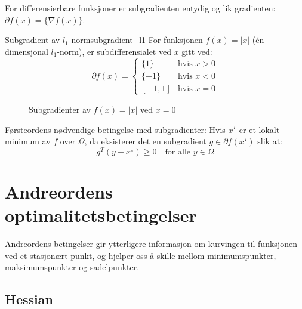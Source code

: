 For differensierbare funksjoner er subgradienten entydig og lik gradienten: $\partial f(x) = \{\nabla f(x)\}$.

\begin{example}{Subgradient av $l_1$-norm}{subgradient_l1}
	For funksjonen $f(x) = |x|$ (én-dimensjonal $l_1$-norm), er subdifferensialet ved $x$ gitt ved:
	\[
		\partial f(x) = \begin{cases}
			\{1\}   & \text{hvis } x > 0 \\
			\{-1\}  & \text{hvis } x < 0 \\
			[-1, 1] & \text{hvis } x = 0
		\end{cases}
	\]

	\begin{figure}[H]
		\centering
		\caption{Subgradienter av $f(x) = |x|$ ved $x = 0$}
		\label{fig:subgradient_l1}
	\end{figure}
\end{example}

Førsteordens nødvendige betingelse med subgradienter: Hvis $x^\star$ er et lokalt minimum av $f$ over $\Omega$, da eksisterer det en subgradient $g \in \partial f(x^\star)$ slik at:
\[
	g^T (y - x^\star) \geq 0 \quad \text{for alle } y \in \Omega
\]

\section{Andreordens optimalitetsbetingelser}

Andreordens betingelser gir ytterligere informasjon om kurvingen til funksjonen ved et stasjonært punkt, og hjelper oss å skille mellom minimumspunkter, maksimumspunkter og sadelpunkter.

\subsection{Hessian}

